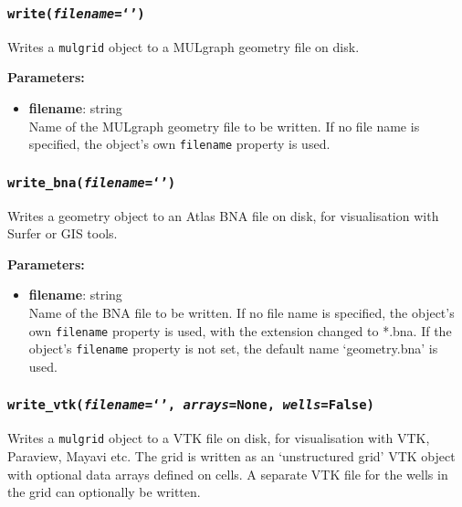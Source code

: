 \subsubsection{\texttt{write(\emph{filename}=`')}}
\label{sec:write}

Writes a \texttt{mulgrid} object to a MULgraph geometry file on disk.

\textbf{Parameters:}
\begin{itemize}
\item \textbf{filename}: string\\
  Name of the MULgraph geometry file to be written.  If no file name is specified, the object's own \texttt{filename} property is used.
\end{itemize}

\subsubsection{\texttt{write\_bna(\emph{filename}=`')}}
\label{sec:write_bna}

Writes a geometry object to an Atlas BNA file on disk, for visualisation with Surfer or GIS tools.

\textbf{Parameters:}
\begin{itemize}
\item \textbf{filename}: string\\
  Name of the BNA file to be written.  If no file name is specified, the object's own \texttt{filename} property is used, with the extension changed to *.bna.  If the object's \texttt{filename} property is not set, the default name `geometry.bna' is used.
\end{itemize}

\subsubsection{\texttt{write\_vtk(\emph{filename}=`', \emph{arrays}=None, \emph{wells}=False)}}
\label{sec:write_vtk}

Writes a \texttt{mulgrid} object to a VTK file on disk, for visualisation with VTK, Paraview, Mayavi etc.  The grid is written as an `unstructured grid' VTK object with optional data arrays defined on cells.  A separate VTK file for the wells in the grid can optionally be written.

